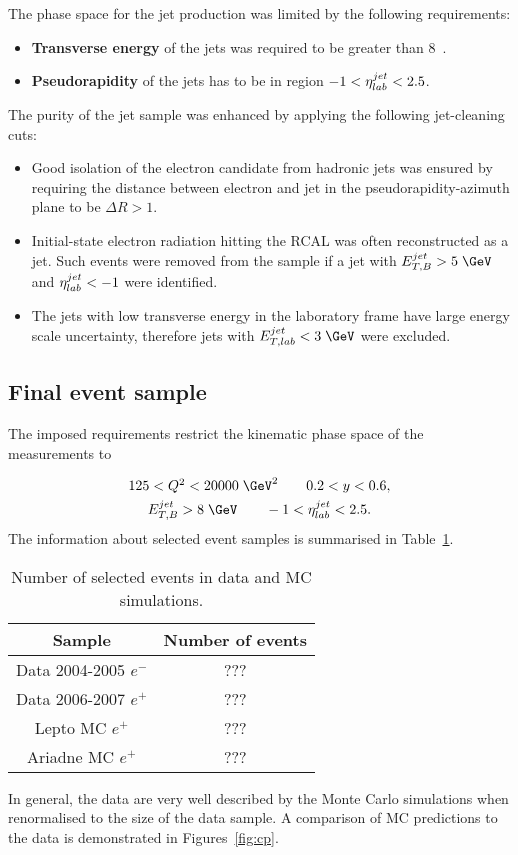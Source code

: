 The phase space for the jet production was limited by the following requirements:
\begin{itemize}
	\item \textbf{Transverse energy} of the jets was required to be greater than 8~\GeV.
	\item \textbf{Pseudorapidity} of the jets has to be in region $-1<\mbox{$\eta^{jet}_{lab}$}<2.5$.
\end{itemize}
The purity of the jet sample was enhanced by applying the following jet-cleaning cuts:

\begin{itemize}
	\item Good isolation of the electron candidate from hadronic jets was ensured by requiring the distance between electron and jet in the pseudorapidity-azimuth plane to be $\Delta R > 1$.
	\item Initial-state electron radiation hitting the RCAL was often reconstructed as a jet. Such events were removed from the sample if a jet with $\etjetb > 5\;\GeV$ and $\mbox{$\eta^{jet}_{lab}$} < -1$ were identified.
	\item The jets with low transverse energy in the laboratory frame have large energy scale uncertainty, therefore jets with $\etjetlab < 3\;\GeV$ were excluded.
\end{itemize}

\subsection{Final event sample}
\label{subsec:eventsampletab}
The imposed requirements restrict the kinematic phase space of the measurements to

\begin{gather}
125 < \qsq < 20000\;\GeV^2 \qquad 0.2 < y < 0.6, \\
\etjetb > 8\;\GeV \qquad -1 < \etajetlab < 2.5.
\end{gather}
The information about selected event samples is summarised in Table~\ref{tab:numevents}.
\begin{table}[htbp]
	\centering
		\begin{tabular}{|c|c|}
			\hline
			Sample & Number of events \\
			\hline
			\hline
			Data 2004-2005 $e^{-}$ & ??? \\
			Data 2006-2007 $e^{+}$ & ??? \\
			Lepto MC $e^{+}$ & ??? \\
			Ariadne MC $e^{+}$ & ??? \\
			\hline
		\end{tabular}
	\caption{Number of selected events in data and MC simulations.}
	\label{tab:numevents}
\end{table}

In general, the data are very well described by the Monte Carlo simulations when renormalised to the size of the data sample. A comparison of MC predictions to the data is demonstrated in Figures~\ref{fig:cp}. 
